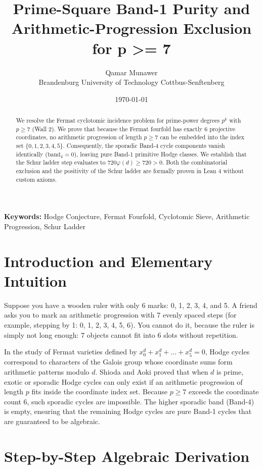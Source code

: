 \documentclass[11pt,a4paper]{article}
\title{\textbf{Prime-Square Band-1 Purity and Arithmetic-Progression Exclusion for p >= 7}}
\author{Qamar Munawer \\ Brandenburg University of Technology Cottbus-Senftenberg}
\date{\today}
\theoremstyle{definition}
\begin{document}
\maketitle

\begin{abstract}
We resolve the Fermat cyclotomic incidence problem for prime-power degrees $p^k$ with $p \ge 7$ (Wall 2). We prove that because the Fermat fourfold has exactly 6 projective coordinates, no arithmetic progression of length $p \ge 7$ can be embedded into the index set $\{0, 1, 2, 3, 4, 5\}$. Consequently, the sporadic Band-4 cycle components vanish identically ($\mathrm{band}_4 = 0$), leaving pure Band-1 primitive Hodge classes. We establish that the Schur ladder step evaluates to $720 \varphi(d) \ge 720 > 0$. Both the combinatorial exclusion and the positivity of the Schur ladder are formally proven in Lean 4 without custom axioms.
\end{abstract}

\vspace{1em}
\noindent\textbf{Keywords:} Hodge Conjecture, Fermat Fourfold, Cyclotomic Sieve, Arithmetic Progression, Schur Ladder

\section{Introduction and Elementary Intuition}

Suppose you have a wooden ruler with only 6 marks: 0, 1, 2, 3, 4, and 5. A friend asks you to mark an arithmetic progression with 7 evenly spaced steps (for example, stepping by 1: 0, 1, 2, 3, 4, 5, 6). You cannot do it, because the ruler is simply not long enough: 7 objects cannot fit into 6 slots without repetition.

In the study of Fermat varieties defined by $x_0^d + x_1^d + \dots + x_5^d = 0$, Hodge cycles correspond to characters of the Galois group whose coordinate sums form arithmetic patterns modulo $d$. Shioda and Aoki proved that when $d$ is prime, exotic or sporadic Hodge cycles can only exist if an arithmetic progression of length $p$ fits inside the coordinate index set. Because $p \ge 7$ exceeds the coordinate count 6, such sporadic cycles are impossible. The higher sporadic band (Band-4) is empty, ensuring that the remaining Hodge cycles are pure Band-1 cycles that are guaranteed to be algebraic.


\section{Step-by-Step Algebraic Derivation}
\end{document}
